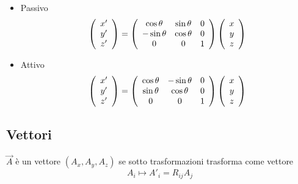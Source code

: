 \begin{itemize}
    \item Passivo
    \begin{equation*}
        \left(\begin{array}[]{c}
            x' \\
            y' \\
            z'
        \end{array}\right) =
        \left(\begin{array}[]{ccc}
            \cos\theta & \sin\theta & 0 \\
            -\sin\theta & \cos\theta & 0 \\
            0 & 0 & 1
        \end{array}\right)
        \left(\begin{array}[]{c}
            x \\
            y \\
            z 
        \end{array}\right)
    \end{equation*}
    \item Attivo
    \begin{equation*}
        \left(\begin{array}[]{c}
            x' \\
            y' \\
            z'
        \end{array}\right) =
        \left(\begin{array}[]{ccc}
            \cos\theta & -\sin\theta & 0 \\
            \sin\theta & \cos\theta & 0 \\
            0 & 0 & 1
        \end{array}\right)
        \left(\begin{array}[]{c}
            x \\
            y \\
            z 
        \end{array}\right)
    \end{equation*}
\end{itemize}

\subsection*{Vettori}

$\vec{A}$ è un vettore $(A_x,A_y,A_z)$ se sotto trasformazioni trasforma come vettore
\begin{equation*}
    A_i \mapsto A'_i = R_{ij}A_j
\end{equation*}

